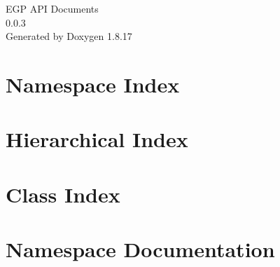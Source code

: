 \let\mypdfximage\pdfximage\def\pdfximage{\immediate\mypdfximage}\documentclass[twoside]{book}
\newcommand{\+}{\discretionary{\mbox{\scriptsize$\hookleftarrow$}}{}{}}
\newcommand{\clearemptydoublepage}{%
  \newpage{\pagestyle{empty}\cleardoublepage}%
}
\begin{document}
\hypersetup{pageanchor=false,
             bookmarksnumbered=true,
             pdfencoding=unicode
            }
\begin{titlepage}
\vspace*{7cm}
\begin{center}%
{\Large E\+GP A\+PI Documents \\[1ex]\large 0.\+0.\+3 }\\
\vspace*{1cm}
{\large Generated by Doxygen 1.8.17}\\
\end{center}
\end{titlepage}
\clearemptydoublepage
{}
\tableofcontents
\clearemptydoublepage
{}
\hypersetup{pageanchor=true}

\chapter{Namespace Index}

\chapter{Hierarchical Index}

\chapter{Class Index}

\chapter{Namespace Documentation}











\end{document}
